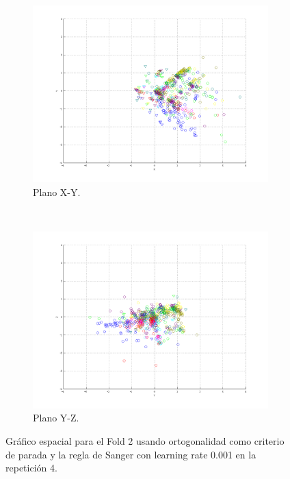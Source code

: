 \documentclass[informe.tex]{subfiles}
\begin{document}
\begin{figure}[H]
        \hspace*{-6.5cm}
        \begin{subfigure}[b]{0.49\textwidth}
                \includegraphics[width=\textwidth]{graficos/fold2_criterioParadao_reglas_alpha0_rep4_2XY.png}
                \caption{Plano X-Y.}
        \end{subfigure}
        ~
        \begin{subfigure}[b]{0.49\textwidth}
                \includegraphics[width=\textwidth]{graficos/fold2_criterioParadao_reglas_alpha0_rep4_3YZ.png}
                \caption{Plano Y-Z.}
        \end{subfigure}
	\restoregeometry
        \caption{Gráfico espacial para el Fold 2 usando ortogonalidad como criterio de parada y la regla de Sanger con learning rate 0.001 en la repetición 4.}
        \label{fig:fold2_criterioParadao_reglas_alpha0_rep4}
	\end{figure}
      
\end{document}
